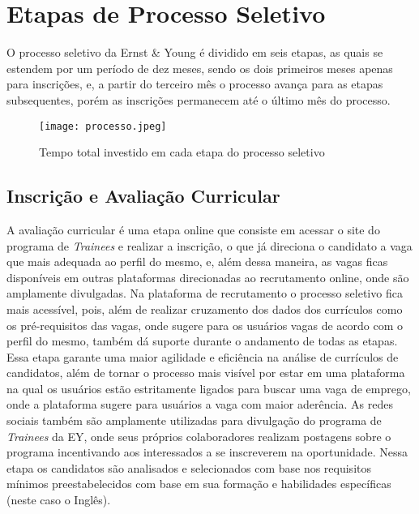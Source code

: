 
\chapter{Etapas de Processo Seletivo}

O processo seletivo da Ernst & Young é dividido em seis etapas, as quais se estendem por um período de dez meses, sendo os dois primeiros meses apenas para inscrições, e, a partir do terceiro mês o processo avança para as etapas subsequentes, porém as inscrições permanecem até o último mês do processo.


\begin{figure}[h]
	\centering
	\texttt{[image: processo.jpeg]}
	\caption{Tempo total investido em cada etapa do processo seletivo}
	\label{fig:mesh1}
	
\end{figure}


\section{Inscrição e Avaliação Curricular}{

A avaliação curricular é uma etapa online que consiste em acessar o site do programa de \textit{Trainees} e realizar a inscrição, o que já direciona o candidato a vaga que mais adequada ao perfil do mesmo, e, além dessa maneira, as vagas ficas disponíveis em outras plataformas direcionadas ao recrutamento online, onde são amplamente divulgadas.
Na plataforma de recrutamento o processo seletivo fica mais acessível, pois, além de realizar cruzamento dos dados dos currículos como os pré-requisitos das vagas, onde sugere para os usuários vagas de acordo com o perfil do mesmo, também dá suporte durante o andamento de todas as etapas. 
Essa etapa garante uma maior agilidade e eficiência na análise de currículos de candidatos, além de tornar o processo mais visível por estar em uma plataforma na qual os usuários estão estritamente ligados para buscar uma vaga de emprego, onde a plataforma sugere para usuários a vaga com maior aderência.
As redes sociais também são amplamente utilizadas para divulgação do programa de \textit{Trainees} da EY, onde seus próprios colaboradores realizam postagens sobre o programa incentivando aos interessados a se inscreverem na oportunidade.
Nessa etapa os candidatos são analisados e selecionados com base nos requisitos mínimos preestabelecidos com base em sua formação e habilidades específicas (neste caso o Inglês).


}



